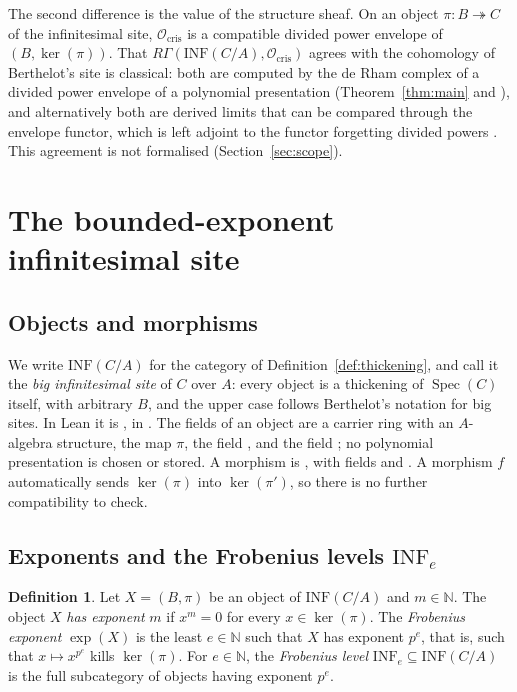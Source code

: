\documentclass[11pt]{amsart}
\newcommand{\spa}{\medskip}
\newcommand{\Ocris}{\mathcal{O}_{\mathrm{cris}}}
\newcommand{\N}{\mathbb{N}}
\DeclareMathOperator{\Spec}{Spec}
\newcommand{\INF}{\mathrm{INF}}
\theoremstyle{plain}
\theoremstyle{definition}
\newtheorem{definition}[theorem]{Definition}
\theoremstyle{remark}
\begin{document}
\spa

The second difference is the value of the structure sheaf. On an object $\pi \colon B \twoheadrightarrow C$ of the infinitesimal site, $\Ocris$ is a compatible divided power envelope of $(B, \ker(\pi))$. That $R\Gamma(\INF(C/A), \Ocris)$ agrees with the cohomology of Berthelot's site is classical: both are computed by the de Rham complex of a divided power envelope of a polynomial presentation (Theorem~\ref{thm:main} and \cite[Tag~07LG]{stacks}), and alternatively both are derived limits that can be compared through the envelope functor, which is left adjoint to the functor forgetting divided powers \cite[Tag~07JK]{stacks}. This agreement is not formalised (Section~\ref{sec:scope}).

\section{The bounded-exponent infinitesimal site}\label{sec:site}

\subsection{Objects and morphisms}

We write $\INF(C/A)$ for the category of Definition~\ref{def:thickening}, and call it the \emph{big infinitesimal site} of $C$ over $A$: every object is a thickening of $\Spec(C)$ itself, with arbitrary $B$, and the upper case follows Berthelot's notation for big sites. In Lean it is , in . The fields of an object are a carrier ring with an $A$-algebra structure, the map \texttt{$\pi$}, the field , and the field ; no polynomial presentation is chosen or stored. A morphism is , with fields  and . A morphism $f$ automatically sends $\ker(\pi)$ into $\ker(\pi')$, so there is no further compatibility to check.

\subsection{Exponents and the Frobenius levels \texorpdfstring{$\INF_e$}{INF\_e}}

\begin{definition}
Let $X = (B, \pi)$ be an object of $\INF(C/A)$ and $m \in \N$. The object $X$ \emph{has exponent} $m$ if $x^m = 0$ for every $x \in \ker(\pi)$. The \emph{Frobenius exponent} $\exp(X)$ is the least $e \in \N$ such that $X$ has exponent $p^e$, that is, such that $x \mapsto x^{p^e}$ kills $\ker(\pi)$. For $e \in \N$, the \emph{Frobenius level} $\INF_e \subseteq \INF(C/A)$ is the full subcategory of objects having exponent $p^e$.
\end{definition}
\end{document}
